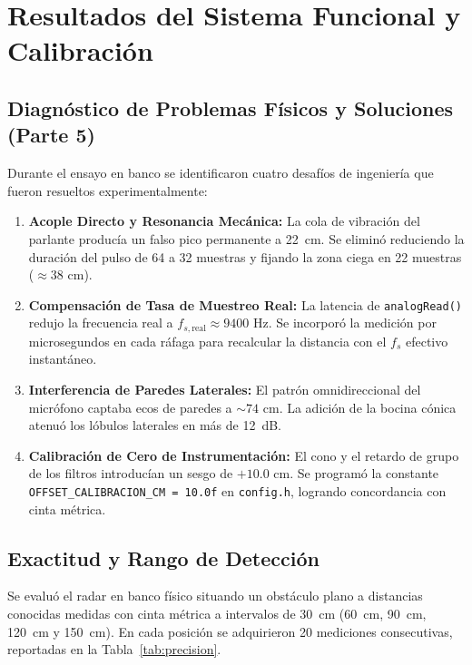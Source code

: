 \documentclass[journal]{IEEEtran}
\begin{document}
\section{Resultados del Sistema Funcional y Calibraci\'on}

\subsection{Diagn\'ostico de Problemas F\'isicos y Soluciones (Parte 5)}
Durante el ensayo en banco se identificaron cuatro desaf\'ios de ingenier\'ia que fueron resueltos experimentalmente:
\begin{enumerate}
\item \textbf{Acople Directo y Resonancia Mec\'anica:} La cola de vibraci\'on del parlante produc\'ia un falso pico permanente a 22~cm. Se elimin\'o reduciendo la duraci\'on del pulso de 64 a 32 muestras y fijando la zona ciega en 22 muestras ($\approx 38\text{ cm}$).
\item \textbf{Compensaci\'on de Tasa de Muestreo Real:} La latencia de \texttt{analogRead()} redujo la frecuencia real a $f_{s,\text{real}} \approx 9400\text{ Hz}$. Se incorpor\'o la medici\'on por microsegundos en cada r\'afaga para recalcular la distancia con el $f_s$ efectivo instant\'aneo.
\item \textbf{Interferencia de Paredes Laterales:} El patr\'on omnidireccional del micr\'ofono captaba ecos de paredes a $\sim 74\text{ cm}$. La adici\'on de la bocina c\'onica atenu\'o los l\'obulos laterales en m\'as de 12~dB.
\item \textbf{Calibraci\'on de Cero de Instrumentaci\'on:} El cono y el retardo de grupo de los filtros introduc\'ian un sesgo de $+10.0\text{ cm}$. Se program\'o la constante \texttt{OFFSET\_CALIBRACION\_CM = 10.0f} en \texttt{config.h}, logrando concordancia con cinta m\'etrica.
\end{enumerate}

\subsection{Exactitud y Rango de Detecci\'on}
Se evalu\'o el radar en banco f\'isico situando un obst\'aculo plano a distancias conocidas medidas con cinta m\'etrica a intervalos de 30~cm (60~cm, 90~cm, 120~cm y 150~cm). En cada posici\'on se adquirieron 20 mediciones consecutivas, reportadas en la Tabla~\ref{tab:precision}.
\end{document}
